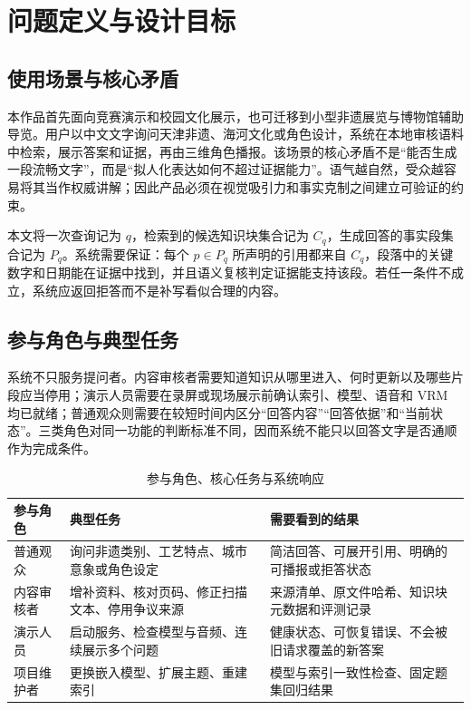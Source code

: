\documentclass[UTF8,zihao=-4,fontset=none,twoside]{ctexart}
\begin{document}
\section{问题定义与设计目标}

\subsection{使用场景与核心矛盾}

本作品首先面向竞赛演示和校园文化展示，也可迁移到小型非遗展览与博物馆辅助导览。用户以中文文字询问天津非遗、海河文化或角色设计，系统在本地审核语料中检索，展示答案和证据，再由三维角色播报。该场景的核心矛盾不是“能否生成一段流畅文字”，而是“拟人化表达如何不超过证据能力”。语气越自然，受众越容易将其当作权威讲解；因此产品必须在视觉吸引力和事实克制之间建立可验证的约束。

本文将一次查询记为 $q$，检索到的候选知识块集合记为 $C_q$，生成回答的事实段集合记为 $P_q$。系统需要保证：每个 $p\in P_q$ 所声明的引用都来自 $C_q$，段落中的关键数字和日期能在证据中找到，并且语义复核判定证据能支持该段。若任一条件不成立，系统应返回拒答而不是补写看似合理的内容。

\subsection{参与角色与典型任务}

系统不只服务提问者。内容审核者需要知道知识从哪里进入、何时更新以及哪些片段应当停用；演示人员需要在录屏或现场展示前确认索引、模型、语音和 VRM 均已就绪；普通观众则需要在较短时间内区分“回答内容”“回答依据”和“当前状态”。三类角色对同一功能的判断标准不同，因而系统不能只以回答文字是否通顺作为完成条件。

\begin{table}[htbp]
\centering
\caption{参与角色、核心任务与系统响应}
\label{tab:stakeholders}
\begin{tabularx}{\linewidth}{@{}P{25mm}Y Y@{}}
\toprule
参与角色 & 典型任务 & 需要看到的结果 \\
\midrule
普通观众 & 询问非遗类别、工艺特点、城市意象或角色设定 & 简洁回答、可展开引用、明确的可播报或拒答状态 \\
内容审核者 & 增补资料、核对页码、修正扫描文本、停用争议来源 & 来源清单、原文件哈希、知识块元数据和评测记录 \\
演示人员 & 启动服务、检查模型与音频、连续展示多个问题 & 健康状态、可恢复错误、不会被旧请求覆盖的新答案 \\
项目维护者 & 更换嵌入模型、扩展主题、重建索引 & 模型与索引一致性检查、固定题集回归结果 \\
\bottomrule
\end{tabularx}
\end{table}
\end{document}
